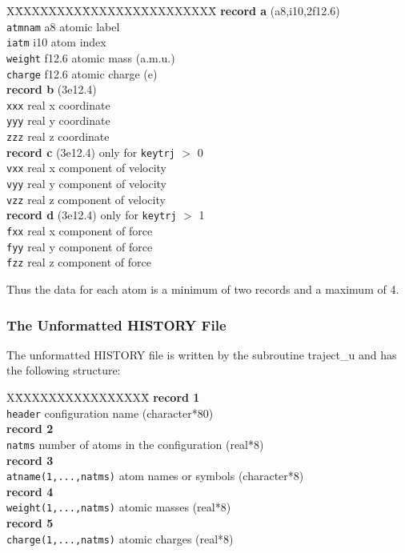 \begin{tabbing}
X\=XXXXXXXX\=XXXXXXXXXXXXXXXX\=\kill
{\bf record a} (a8,i10,2f12.6) \\
\> {\tt atmnam} \> a8 \> atomic label\\
\> {\tt iatm} \> i10 \>  atom index\\
\> {\tt weight} \> f12.6 \> atomic mass (a.m.u.)\\
\> {\tt  charge} \> f12.6 \> atomic charge (e) \\
{\bf record b} (3e12.4)\\
\> {\tt xxx} \> real \> x coordinate\\
\> {\tt yyy} \> real \> y coordinate\\
\> {\tt zzz} \> real \> z coordinate\\
{\bf record c} (3e12.4) only for {\tt keytrj} $>$ 0\\
\> {\tt vxx} \> real \> x component of velocity\\
\> {\tt vyy} \> real \> y component of velocity\\
\> {\tt vzz} \> real \> z component of velocity\\
{\bf record d} (3e12.4) only for {\tt keytrj} $>$ 1\\
\> {\tt fxx} \> real \> x component of force\\
\> {\tt fyy} \> real \> y component of force\\
\> {\tt fzz} \> real \> z component of force\\
\end{tabbing}
Thus the data for each atom is a minimum of two records and a maximum
of 4.

\subsubsection{The Unformatted HISTORY File}

The unformatted HISTORY file is written by the subroutine {\sc
traject\_u} and has the following structure:

\begin{tabbing}
X\=XXXXXXXXXXXXXXXX\=\kill
{\bf record 1}\\
\> {\tt header} \> configuration name (character*80)\\
{\bf record 2}\\
\> {\tt natms} \> number of atoms in the configuration (real*8)\\
{\bf record 3}\\
\> {\tt atname(1,...,natms)} \> atom names or symbols (character*8)\\
{\bf record 4}\\
\> {\tt weight(1,...,natms)} \> atomic masses (real*8)\\
{\bf record 5}\\
\> {\tt charge(1,...,natms)} \> atomic charges (real*8)\\
\end{tabbing}

